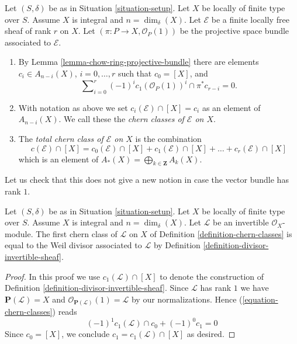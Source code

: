 \begin{definition}
\label{definition-chern-classes}
Let $(S, \delta)$ be as in Situation \ref{situation-setup}.
Let $X$ be locally of finite type over $S$.
Assume $X$ is integral and $n = \dim_\delta(X)$.
Let $\mathcal{E}$ be a finite locally free sheaf of rank $r$
on $X$. Let $(\pi : P \to X, \mathcal{O}_P(1))$ be the projective space
bundle associated to $\mathcal{E}$.
\begin{enumerate}
\item By Lemma \ref{lemma-chow-ring-projective-bundle} there are
elements $c_i \in A_{n - i}(X)$, $i = 0, \ldots, r$
such that $c_0 = [X]$, and
\begin{equation}
\label{equation-chern-classes}
\sum\nolimits_{i = 0}^r
(-1)^i c_1(\mathcal{O}_P(1))^i \cap \pi^*c_{r - i}
= 0.
\end{equation}
\item With notation as above we set
$c_i(\mathcal{E}) \cap [X] = c_i$
as an element of $A_{n - i}(X)$.
We call these the {\it chern classes of $\mathcal{E}$ on $X$}.
\item The {\it total chern class of $\mathcal{E}$ on $X$}
is the combination
$$
c({\mathcal E}) \cap [X] =
c_0({\mathcal E}) \cap [X]
+ c_1({\mathcal E}) \cap [X] + \ldots
+ c_r({\mathcal E}) \cap [X]
$$
which is an element of
$A_*(X) = \bigoplus_{k \in \mathbf{Z}} A_k(X)$.
\end{enumerate}
\end{definition}

\noindent
Let us check that this does not give a new notion in case the
vector bundle has rank $1$.

\begin{lemma}
\label{lemma-first-chern-class}
Let $(S, \delta)$ be as in Situation \ref{situation-setup}.
Let $X$ be locally of finite type over $S$.
Assume $X$ is integral and $n = \dim_\delta(X)$.
Let $\mathcal{L}$ be an invertible $\mathcal{O}_X$-module.
The first chern class of $\mathcal{L}$ on $X$ of
Definition \ref{definition-chern-classes}
is equal to the Weil divisor associated to $\mathcal{L}$
by Definition \ref{definition-divisor-invertible-sheaf}.
\end{lemma}

\begin{proof}
In this proof we use $c_1(\mathcal{L}) \cap [X]$ to denote the
construction of Definition \ref{definition-divisor-invertible-sheaf}.
Since $\mathcal{L}$ has rank $1$ we have
$\mathbf{P}(\mathcal{L}) = X$ and
$\mathcal{O}_{\mathbf{P}(\mathcal{L})}(1) = \mathcal{L}$
by our normalizations. Hence (\ref{equation-chern-classes})
reads
$$
(-1)^1 c_1(\mathcal{L}) \cap c_0 + (-1)^0 c_1 = 0
$$
Since $c_0 = [X]$, we conclude $c_1 = c_1(\mathcal{L}) \cap [X]$
as desired.
\end{proof}

